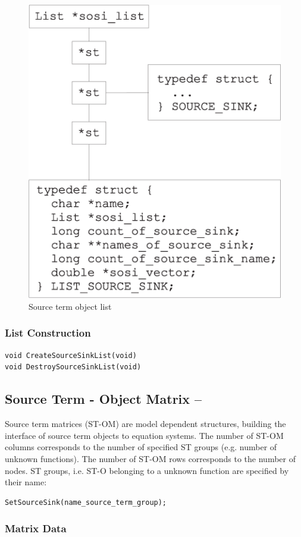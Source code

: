 \begin{figure}[htb!]
\begin{center}
\footnotesize
\includegraphics[width=0.4\columnwidth]{figures/st_list.eps}  %
\caption{Source term object list }
\label{fig:st_list}
\end{center}
\end{figure}
%

\subsubsection*{List Construction}

\small
\begin{verbatim}
void CreateSourceSinkList(void)
void DestroySourceSinkList(void)
\end{verbatim}
\normalsize


\subsection{Source Term - Object Matrix -- }

Source term matrices (ST-OM) are model dependent structures,
building the interface of source term objects to equation systems.
The number of ST-OM columns corresponds to the number of specified ST groups
(e.g. number of unknown functions).
The number of ST-OM rows corresponds to the number of nodes.
ST groups, i.e. ST-O belonging to a unknown function are specified by their name:
\small
\begin{verbatim}
SetSourceSink(name_source_term_group);
\end{verbatim}
\normalsize

\subsubsection*{Matrix Data}

